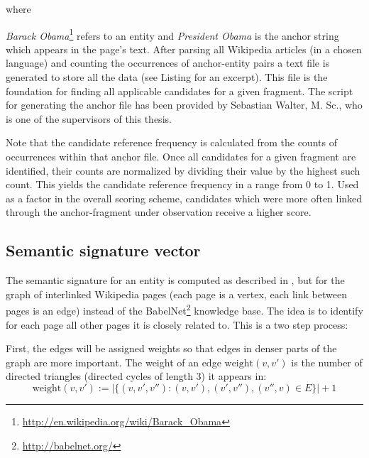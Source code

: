 \documentclass[runningheads,a4paper]{llncs}
\begin{document}
where {\textit{Barack Obama}\footnote{\url{http://en.wikipedia.org/wiki/Barack_Obama}} refers to an entity and \textit{President Obama} is the anchor string which appears in the page's text. After parsing all Wikipedia articles (in a chosen language) and counting the occurrences of anchor-entity pairs a text file is generated to store all the data (see Listing 
for an excerpt). This file is the foundation for finding all applicable candidates for a given fragment. The script for generating the anchor file has been provided by Sebastian Walter, M. Sc., who is one of the supervisors of this thesis.


Note that the candidate reference frequency is calculated from the counts of occurrences within that anchor file. Once all candidates for a given fragment are identified, their counts are normalized by dividing their value by the highest such count. This yields the candidate reference frequency in a range from 0 to 1. Used as a factor in the overall scoring scheme, candidates which were more often linked through the anchor-fragment under observation receive a higher score.

\subsection{Semantic signature vector}\label{subsec:semsig}
The semantic signature for an entity is computed as described in \cite{Babelfy}, but for the graph of interlinked Wikipedia pages (each page is a vertex, each link between pages is an edge) instead of the BabelNet\footnote{\url{http://babelnet.org/}} knowledge base. The idea is to identify for each page all other pages it is closely related to. This is a two step process:

First, the edges will be assigned weights so that edges in denser parts of the graph are more important. The weight of an edge $\mathrm{weight}(v, v')$ is the number of directed triangles (directed cycles of length 3) it appears in:
$$\mathrm{weight}(v, v') := |\{(v, v', v'') : (v, v'), (v', v''), (v'', v) \in E\}| + 1$$

}
\end{document}
